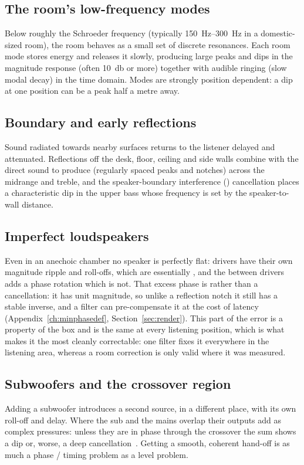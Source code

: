 \subsection{The room's low-frequency modes}
Below roughly the Schroeder frequency (typically \SIrange{150}{300}{\hertz} in a domestic-sized room), the room behaves as a small set of discrete resonances. Each room mode stores energy and releases it slowly, producing large peaks and dips in the magnitude response (often \SI{10}{\decibel} or more) together with audible
ringing (slow modal decay) in the time domain. Modes are strongly position dependent: a dip at one position can be a peak half a metre away.

\subsection{Boundary and early reflections}
Sound radiated towards nearby surfaces returns to the listener delayed and attenuated. Reflections off the desk, floor, ceiling and side walls combine with the direct sound to produce  (regularly spaced peaks and notches) across the midrange and treble, and the speaker-boundary interference () cancellation places a characteristic dip in the
upper bass whose frequency is set by the speaker-to-wall distance.

\subsection{Imperfect loudspeakers}
Even in an anechoic chamber no speaker is perfectly flat: drivers have their own magnitude ripple and roll-offs, which are essentially , and the  between drivers adds a phase rotation which is not. That excess phase is  rather than a cancellation: it has unit magnitude, so unlike a reflection notch it still has a stable inverse, and a  filter can pre-compensate it at the cost of latency (Appendix~\ref{ch:minphasedef}, Section~\ref{sec:render}). This part of the error is a property of the box and is the same at every listening position, which is what makes it the most cleanly correctable: one filter fixes it everywhere in the listening area, whereas a room correction is only valid where it was measured.

\subsection{Subwoofers and the crossover region}
Adding a subwoofer introduces a second source, in a different place, with its own roll-off and delay. Where the sub and the mains overlap their outputs add as complex pressures: unless they are in phase through the crossover the sum shows a dip or, worse, a deep cancellation~\cite{Linkwitz1976}. Getting a smooth, coherent hand-off is as much a phase / timing problem as a
level problem.

